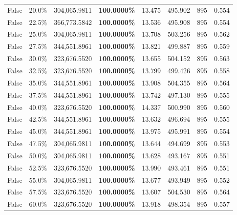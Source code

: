 \begin{table}[H]
\begin{tabular}{lllrllll}
\cline{1-8}
False & 20.0\% & \color{red} 304,065.9811 & \bfseries \color{red} 100.0000\% & 13.475 & 495.902 & 895 & 0.554 \\
\cline{1-8}
False & 22.5\% & 366,773.5842 & \bfseries \color{red} 100.0000\% & 13.536 & 495.908 & 895 & 0.554 \\
\cline{1-8}
False & 25.0\% & \color{red} 304,065.9811 & \bfseries \color{red} 100.0000\% & 13.708 & 503.256 & 895 & 0.562 \\
\cline{1-8}
False & 27.5\% & 344,551.8961 & \bfseries \color{red} 100.0000\% & 13.821 & 499.887 & 895 & 0.559 \\
\cline{1-8}
False & 30.0\% & 323,676.5520 & \bfseries \color{red} 100.0000\% & 13.655 & 504.152 & 895 & 0.563 \\
\cline{1-8}
False & 32.5\% & 323,676.5520 & \bfseries \color{red} 100.0000\% & 13.799 & 499.426 & 895 & 0.558 \\
\cline{1-8}
False & 35.0\% & 344,551.8961 & \bfseries \color{red} 100.0000\% & 13.908 & 504.355 & 895 & 0.564 \\
\cline{1-8}
False & 37.5\% & 344,551.8961 & \bfseries \color{red} 100.0000\% & 13.742 & 497.130 & 895 & 0.555 \\
\cline{1-8}
False & 40.0\% & 323,676.5520 & \bfseries \color{red} 100.0000\% & 14.337 & 500.990 & 895 & 0.560 \\
\cline{1-8}
False & 42.5\% & 344,551.8961 & \bfseries \color{red} 100.0000\% & 13.632 & 496.694 & 895 & 0.555 \\
\cline{1-8}
False & 45.0\% & 344,551.8961 & \bfseries \color{red} 100.0000\% & 13.975 & 495.991 & 895 & 0.554 \\
\cline{1-8}
False & 47.5\% & \color{red} 304,065.9811 & \bfseries \color{red} 100.0000\% & 13.644 & 494.699 & 895 & 0.553 \\
\cline{1-8}
False & 50.0\% & \color{red} 304,065.9811 & \bfseries \color{red} 100.0000\% & 13.628 & 493.167 & 895 & 0.551 \\
\cline{1-8}
False & 52.5\% & 323,676.5520 & \bfseries \color{red} 100.0000\% & 13.990 & 493.461 & 895 & 0.551 \\
\cline{1-8}
False & 55.0\% & \color{red} 304,065.9811 & \bfseries \color{red} 100.0000\% & 13.677 & 493.949 & 895 & 0.552 \\
\cline{1-8}
False & 57.5\% & 323,676.5520 & \bfseries \color{red} 100.0000\% & 13.607 & 504.530 & 895 & 0.564 \\
\cline{1-8}
False & 60.0\% & 323,676.5520 & \bfseries \color{red} 100.0000\% & 13.918 & 498.354 & 895 & 0.557 \\

\end{tabular}
\end{table}
